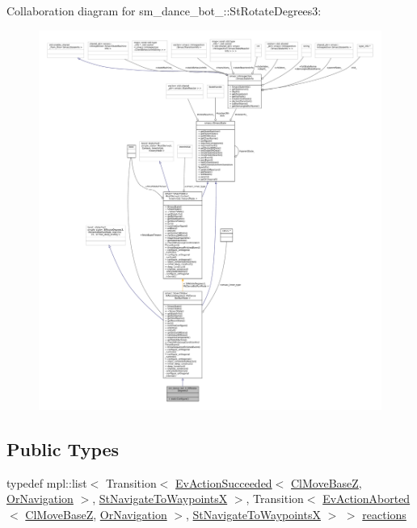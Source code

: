 Collaboration diagram for sm\+\_\+dance\+\_\+bot\+\_\+:\+:St\+Rotate\+Degrees3\+:
\nopagebreak
\begin{figure}[H]
\begin{center}
\leavevmode
\includegraphics[width=350pt]{structsm__dance__bot__2_1_1StRotateDegrees3__coll__graph}
\end{center}
\end{figure}
\subsection*{Public Types}
\begin{DoxyCompactItemize}
\item 
typedef mpl\+::list$<$ Transition$<$ \hyperlink{structsmacc_1_1default__events_1_1EvActionSucceeded}{Ev\+Action\+Succeeded}$<$ \hyperlink{classcl__move__base__z_1_1ClMoveBaseZ}{Cl\+Move\+BaseZ}, \hyperlink{classsm__dance__bot__2_1_1OrNavigation}{Or\+Navigation} $>$, \hyperlink{structsm__dance__bot__2_1_1StNavigateToWaypointsX}{St\+Navigate\+To\+WaypointsX} $>$, Transition$<$ \hyperlink{structsmacc_1_1default__events_1_1EvActionAborted}{Ev\+Action\+Aborted}$<$ \hyperlink{classcl__move__base__z_1_1ClMoveBaseZ}{Cl\+Move\+BaseZ}, \hyperlink{classsm__dance__bot__2_1_1OrNavigation}{Or\+Navigation} $>$, \hyperlink{structsm__dance__bot__2_1_1StNavigateToWaypointsX}{St\+Navigate\+To\+WaypointsX} $>$ $>$ \hyperlink{structsm__dance__bot__2_1_1StRotateDegrees3_afba3c9cb04c164c985626e9abcfd5ea8}{reactions}
\end{DoxyCompactItemize}
